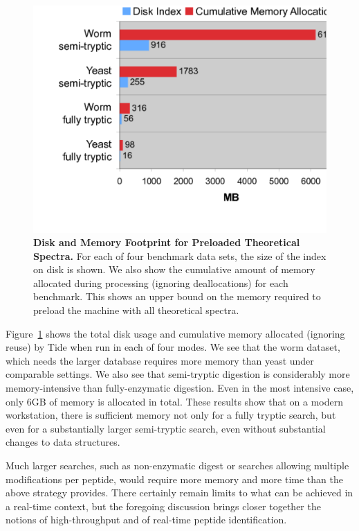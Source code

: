 \documentclass[12pt,twoside,openright]{report}
\begin{document}
\begin{figure}
\centering
\includegraphics[width=6.0in]{mem_footprint.pdf}
\caption[Disk and Memory Footprint for Preloaded Theoretical Spectra]{{\bf Disk
    and Memory Footprint for Preloaded Theoretical Spectra.} For each of four
  benchmark data sets, the size of the index on disk is shown. We also show the
  cumulative amount of memory allocated during processing (ignoring
  deallocations) for each benchmark. This shows an upper bound on the memory
  required to preload the machine with all theoretical spectra.
  \label{figure:footprints}}
\end{figure}

Figure~\ref{figure:footprints} shows the total disk usage and cumulative memory
allocated (ignoring reuse) by Tide when run in each of four modes. We see that
the worm dataset, which needs the larger database requires more memory than
yeast under comparable settings. We also see that semi-tryptic digestion is
considerably more memory-intensive than fully-enzymatic digestion. Even in the
most intensive case, only 6GB of memory is allocated in total. These results
show that on a modern workstation, there is sufficient memory not only for a
fully tryptic search, but even for a substantially larger semi-tryptic search,
even without substantial changes to data structures.

Much larger searches, such as non-enzymatic digest or searches allowing multiple
modifications per peptide, would require more memory and more time than the
above strategy provides. There certainly remain limits to what can be achieved
in a real-time context, but the foregoing discussion brings closer together the
notions of high-throughput and of real-time peptide identification.
\end{document}
